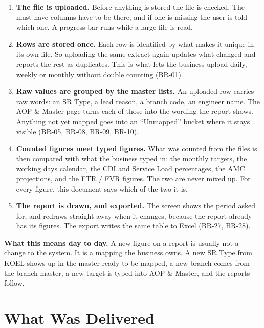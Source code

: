 \documentclass[11pt,a4paper]{article}
\newcommand{\qt}[1]{\textquotedblleft #1\textquotedblright}
\begin{document}
\begin{enumerate}[leftmargin=2.2em,itemsep=5pt]
  \item \textbf{The file is uploaded.} Before anything is stored the file is checked. The
  must-have columns have to be there, and if one is missing the user is told which one. A
  progress bar runs while a large file is read.

  \item \textbf{Rows are stored once.} Each row is identified by what makes it unique in
  its own file. So uploading the same extract again updates what changed and reports the
  rest as duplicates. This is what lets the business upload daily, weekly or monthly
  without double counting (BR-01).

  \item \textbf{Raw values are grouped by the master lists.} An uploaded row carries raw
  words: an SR Type, a lead reason, a branch code, an engineer name. The AOP \& Master page
  turns each of those into the wording the report shows. Anything not yet mapped goes into
  an \qt{Unmapped} bucket where it stays visible (BR-05, BR-08, BR-09, BR-10).

  \item \textbf{Counted figures meet typed figures.} What was counted from the files is
  then compared with what the business typed in: the monthly targets, the working days
  calendar, the CDI and Service Load percentages, the AMC projections, and the FTR / FVR
  figures. The two are never mixed up. For every figure, this document says which of the
  two it is.

  \item \textbf{The report is drawn, and exported.} The screen shows the period asked for,
  and redraws straight away when it changes, because the report already has its figures.
  The export writes the same table to Excel (BR-27, BR-28).
\end{enumerate}

\textbf{What this means day to day.} A new figure on a report is usually not a change to
the system. It is a mapping the business owns. A new SR Type from KOEL shows up in the
master ready to be mapped, a new branch comes from the branch master, a new target is
typed into AOP \& Master, and the reports follow.

\section{What Was Delivered}
\end{document}
